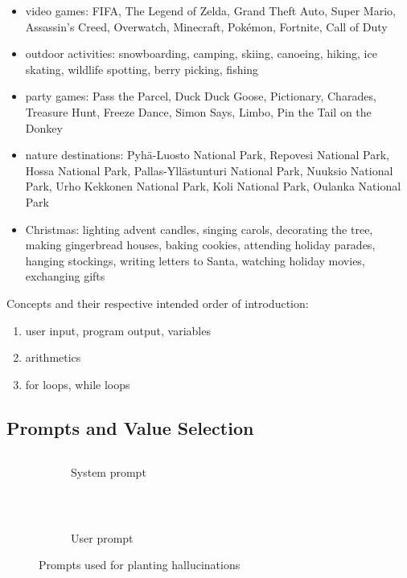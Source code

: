 \documentclass[english, 12pt, a4paper, sci, utf8, a-2b, online]{latex/definitions/aaltothesis}
\begin{document}
\begin{itemize}
    \item video games: FIFA, The Legend of Zelda, Grand Theft Auto, Super Mario, Assassin's Creed, Overwatch, Minecraft, Pokémon, Fortnite, Call of Duty
    \item outdoor activities: snowboarding, camping, skiing, canoeing, hiking, ice skating, wildlife spotting, berry picking, fishing
    \item party games: Pass the Parcel, Duck Duck Goose, Pictionary, Charades, Treasure Hunt, Freeze Dance, Simon Says, Limbo, Pin the Tail on the Donkey
    \item nature destinations: Pyhä-Luosto National Park, Repovesi National Park, Hossa National Park, Pallas-Yllästunturi National Park, Nuuksio National Park, Urho Kekkonen National Park, Koli National Park, Oulanka National Park
    \item Christmas: lighting advent candles, singing carols, decorating the tree, making gingerbread houses, baking cookies, attending holiday parades, hanging stockings, writing letters to Santa, watching holiday movies, exchanging gifts
\end{itemize}

Concepts and their respective intended order of introduction:
\begin{enumerate}
    \item user input, program output, variables
    \item arithmetics
    \item for loops, while loops
\end{enumerate}

\subsection{Prompts and Value Selection}
\begin{figure}[!h]
    \centering
    \begin{subfigure}[b]{0.49\textwidth}
        \centering
    \inputminted{text}{./minted_inputs/augment_system_prompt.txt}
    \caption{System prompt}
    \label{fig:augment_system_prompt}
    \end{subfigure}%
    ~ 
    \begin{subfigure}[b]{0.49\textwidth}
        \centering
    \inputminted{text}{./minted_inputs/augment_user_prompt.txt}
    \caption{User prompt}
    \label{fig:augment_user_prompt}
    \end{subfigure}
    \caption{Prompts used for planting hallucinations}
\end{figure}
\end{document}
